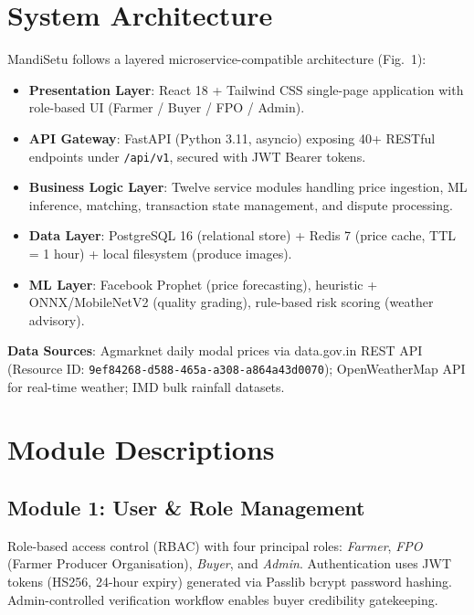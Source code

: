 \documentclass[conference]{IEEEtran}
\begin{document}
\section{System Architecture}
\label{sec:architecture}

MandiSetu follows a layered microservice-compatible architecture (Fig.~1):

\begin{itemize}
\item \textbf{Presentation Layer}: React 18 + Tailwind CSS single-page application with role-based UI (Farmer / Buyer / FPO / Admin).
\item \textbf{API Gateway}: FastAPI (Python 3.11, asyncio) exposing 40+ RESTful endpoints under \texttt{/api/v1}, secured with JWT Bearer tokens.
\item \textbf{Business Logic Layer}: Twelve service modules handling price ingestion, ML inference, matching, transaction state management, and dispute processing.
\item \textbf{Data Layer}: PostgreSQL 16 (relational store) + Redis 7 (price cache, TTL = 1 hour) + local filesystem (produce images).
\item \textbf{ML Layer}: Facebook Prophet (price forecasting), heuristic + ONNX/MobileNetV2 (quality grading), rule-based risk scoring (weather advisory).
\end{itemize}

\textbf{Data Sources}: Agmarknet daily modal prices via data.gov.in REST API (Resource ID: \texttt{9ef84268-d588-465a-a308-a864a43d0070}); OpenWeatherMap API for real-time weather; IMD bulk rainfall datasets.

\section{Module Descriptions}
\label{sec:modules}

\subsection{Module 1: User \& Role Management}
Role-based access control (RBAC) with four principal roles: \textit{Farmer}, \textit{FPO} (Farmer Producer Organisation), \textit{Buyer}, and \textit{Admin}. Authentication uses JWT tokens (HS256, 24-hour expiry) generated via Passlib bcrypt password hashing. Admin-controlled verification workflow enables buyer credibility gatekeeping.
\end{document}
